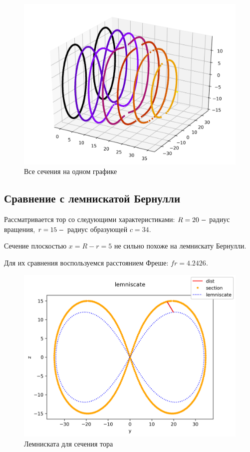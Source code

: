 \documentclass[a4]{article}
\begin{document}
\begin{figure}[H]
\caption{Все сечения на одном графике }
\includegraphics[scale=0.9]{TC8.png} 
\end{figure}

\newpage

\subsection{Сравнение с лемнискатой Бернулли}
Рассматривается тор со следующими характеристиками: $R=20\;\--$ радиус вращения, $r=15\;\--$ радиус образующей $c=34.$

Сечение плоскостью $x=R-r=5$ не сильно похоже на лемнискату Бернулли. 

Для их сравнения воспользуемся расстоянием Фреше: $fr = 4.2426.$


\begin{figure}[H]
\caption{Лемниската для сечения тора }
\includegraphics[scale=0.4]{lemniscate1.png} 
\end{figure}
\end{document}
